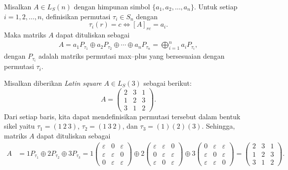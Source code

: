 \begin{proposisi}\label{prop:dekomposisi_latin_square}
  Misalkan $A \in L_S(n)$ dengan himpunan simbol
  $\{a_1, a_2, \ldots, a_n\}$.
  Untuk setiap $i = 1,2,\ldots,n$, definisikan permutasi $\tau_i \in S_n$ dengan
  \[
    \tau_i(r) = c \iff [A]_{r c} = a_i.
  \]
  Maka matriks $A$ dapat dituliskan sebagai
  \begin{align}\label{eq:dekomposisi_latin_square_maxplus}
    A = a_1 P_{\tau_1} \oplus a_2 P_{\tau_2} \oplus \cdots \oplus a_n P_{\tau_n}
    = \bigoplus_{i=1}^{n} a_i P_{\tau_i},
  \end{align}
  dengan $P_{\tau_i}$ adalah matriks permutasi max--plus yang bersesuaian dengan permutasi
  $\tau_i$.
\end{proposisi}

\begin{contoh}
  Misalkan diberikan \textit{Latin square} $A \in L_S(3)$ sebagai berikut:
  \[
    A =
    \begin{pmatrix}
      2 & 3 & 1 \\
      1 & 2 & 3 \\
      3 & 1 & 2
    \end{pmatrix}.
  \]
  Dari setiap baris, kita dapat mendefinisikan permutasi tersebut dalam bentuk sikel yaitu $\tau_1=(1\ 2\ 3)$, $\tau_2=(1\ 3\ 2)$, dan $\tau_3=(1)(2)(3)$. Sehingga, matriks $A$ dapat dituliskan sebagai
  \begin{align*}
    A & = 1 P_{\tau_1} \oplus 2 P_{\tau_2} \oplus 3 P_{\tau_3}
    = 1
    \begin{pmatrix}
      \varepsilon & 0           & \varepsilon \\
      \varepsilon & \varepsilon & 0           \\
      0           & \varepsilon & \varepsilon
    \end{pmatrix}
    \oplus 2
    \begin{pmatrix}
      \varepsilon & \varepsilon & 0           \\
      0           & \varepsilon & \varepsilon \\
      \varepsilon & 0           & \varepsilon
    \end{pmatrix}
    \oplus 3
    \begin{pmatrix}
      0           & \varepsilon & \varepsilon \\
      \varepsilon & 0           & \varepsilon \\
      \varepsilon & \varepsilon & 0
    \end{pmatrix}
    =
    \begin{pmatrix}
      2 & 3 & 1 \\
      1 & 2 & 3 \\
      3 & 1 & 2
    \end{pmatrix}.
  \end{align*}
\end{contoh}



